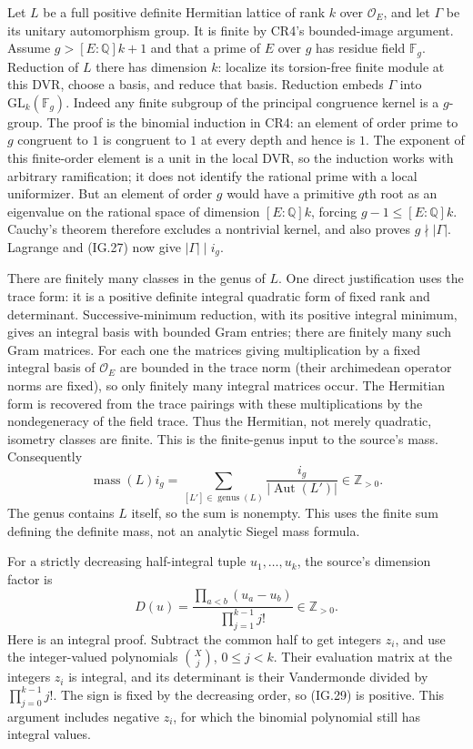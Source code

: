 Let $L$ be a full positive definite Hermitian lattice of rank
$k$ over $\mathcal O_E$, and let $\Gamma$ be its unitary
automorphism group. It is finite by CR4's bounded-image argument.
Assume $g>[E:\mathbb Q]k+1$ and that a prime of $E$ over $g$
has residue field $\mathbb F_g$. Reduction of $L$ there has
dimension $k$: localize its torsion-free finite module at this
DVR, choose a basis, and reduce that basis. Reduction embeds
$\Gamma$ into $\mathrm{GL}_k(\mathbb F_g)$.
Indeed any finite subgroup of the principal congruence kernel
is a $g$-group. The proof is the binomial induction in CR4:
an element of order prime to $g$ congruent to $1$ is congruent
to $1$ at every depth and hence is $1$.
The exponent of this finite-order element is a unit in the local
DVR, so the induction works with arbitrary ramification; it does
not identify the rational prime with a local uniformizer.
But an element of order $g$ would have a primitive $g$th root
as an eigenvalue on the rational space of dimension
$[E:\mathbb Q]k$, forcing $g-1\le[E:\mathbb Q]k$.
Cauchy's theorem therefore excludes a nontrivial kernel,
and also proves $g\nmid|\Gamma|$.
Lagrange and (IG.27) now give $|\Gamma|\mid i_g$.

There are finitely many classes in the genus of $L$.
One direct justification uses the trace form: it is a positive
definite integral quadratic form of fixed rank and determinant.
Successive-minimum reduction, with its positive integral minimum,
gives an integral basis with bounded Gram entries; there are
finitely many such Gram matrices. For each one the matrices
giving multiplication by a fixed integral basis of $\mathcal O_E$
are bounded in the trace norm (their archimedean operator norms
are fixed), so only finitely many integral matrices occur.
The Hermitian form is recovered from the trace pairings with
these multiplications by the nondegeneracy of the field trace.
Thus the Hermitian, not merely quadratic, isometry classes are
finite. This is the finite-genus input to the source's mass.
Consequently
\[
       \operatorname{mass}(L)i_g
          =\sum_{[L']\in\operatorname{genus}(L)}
                         \frac{i_g}{|\operatorname{Aut}(L')|}
               \in\mathbb Z_{>0}.                    \tag{IG.28}
\]
The genus contains $L$ itself, so the sum is nonempty. This
uses the finite sum defining the definite mass, not an analytic
Siegel mass formula.

For a strictly decreasing half-integral tuple $u_1,\ldots,u_k$,
the source's dimension factor is
\[
              D(u)=\frac{\prod_{a<b}(u_a-u_b)}
                                   {\prod_{j=1}^{k-1}j!}
                       \in\mathbb Z_{>0}.             \tag{IG.29}
\]
Here is an integral proof. Subtract the common half to get
integers $z_i$, and use the integer-valued polynomials
$\binom{X}{j}$, $0\le j<k$. Their evaluation matrix at the
integers $z_i$ is integral, and its determinant is their
Vandermonde divided by $\prod_{j=0}^{k-1}j!$.
The sign is fixed by the decreasing order, so (IG.29) is
positive. This argument includes negative $z_i$, for which
the binomial polynomial still has integral values.

